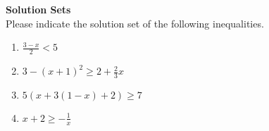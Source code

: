 \textbf{Solution Sets}\\
Please indicate the solution set of the following inequalities. 
\begin{enumerate}
	\item $\frac{3-x}{2} < 5$
	\item $3 - (x+1)^2 \geq 2 + \frac{2}{3}x$
	\item $5(x + 3(1-x)+2) \geq 7$
	\item $x+2 \geq -\frac{1}{x}$
\end{enumerate} 
